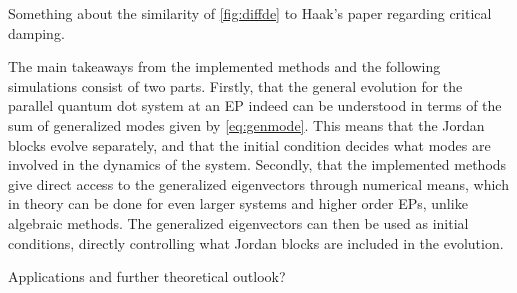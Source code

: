 \documentclass[../main.tex]{subfiles}
\begin{document}
Something about the similarity of \cref{fig:diffde} to Haak's paper regarding critical damping.

The main takeaways from the implemented methods and the following simulations consist of two parts. Firstly, that the general evolution for the parallel quantum dot system at an EP indeed can be understood in terms of the sum of generalized modes given by \cref{eq:genmode}. This means that the Jordan blocks evolve separately, and that the initial condition decides what modes are involved in the dynamics of the system. Secondly, that the implemented methods give direct access to the generalized eigenvectors through numerical means, which in theory can be done for even larger systems and higher order EPs, unlike algebraic methods. The generalized eigenvectors can then be used as initial conditions, directly controlling what Jordan blocks are included in the evolution.

Applications and further theoretical outlook?
\end{document}
